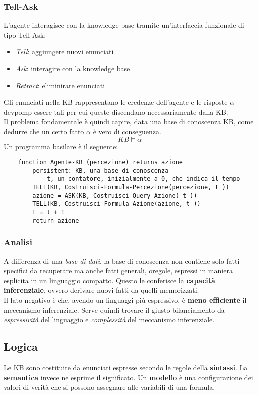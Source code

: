 \subsubsection{Tell-Ask}
L'agente interagisce con la knowledge base tramite un'interfaccia funzionale di tipo Tell-Ask:
\begin{itemize}
	\item \textit{Tell}: aggiungere nuovi enunciati
	\item \textit{Ask}: interagire con la knowledge base
	\item \textit{Retract}: eliminirare enunciati
\end{itemize}
Gli enunciati nella KB rappresentano le credenze dell'agente e le risposte $\alpha$ devpomp essere tali per cui queste discendano necessariamente dalla KB.\\
Il problema fondamentale è quindi capire, data una base di conoscenza KB, come dedurre che un certo fatto $\alpha$ è vero di conseguenza.
\begin{equation}
	KB \models \alpha
\end{equation}
Un programma basilare è il seguente:
\begin{lstlisting}
	function Agente-KB (percezione) returns azione
		persistent: KB, una base di conoscenza
			t, un contatore, inizialmente a 0, che indica il tempo
		TELL(KB, Costruisci-Formula-Percezione(percezione, t ))
		azione = ASK(KB, Costruisci-Query-Azione( t ))
		TELL(KB, Costruisci-Formula-Azione(azione, t ))
		t = t + 1
		return azione
\end{lstlisting}
\subsubsection{Analisi}
A differenza di una \textit{base di dati}, la base di conoscenza non contiene solo fatti specifici da recuperare ma anche fatti generali, oregole, espressi in maniera esplicita in un linguaggio compatto. Questo le conferisce la \textbf{capacità inferenziale}, ovvero derivare nuovi fatti da quelli memorizzati.\\
Il lato negativo è che, avendo un linguaggi  più espressivo, è \textbf{meno efficiente} il meccanismo inferenziale. Serve quindi trovare il giusto bilanciamento da \textit{espressività} del linguaggio e \textit{complessità} del meccanismo inferenziale.

\subsection{Logica}
Le KB sono costituite da enunciati espresse secondo le regole della \textbf{sintassi}. La \textbf{semantica} invece ne esprime il significato. Un \textbf{modello} è una configurazione dei valori di verità che si possono assegnare alle variabili di una formula.
